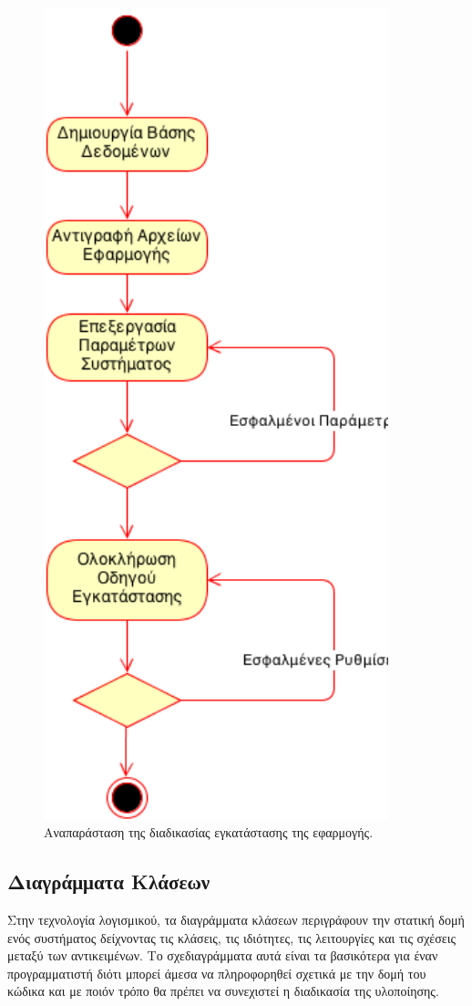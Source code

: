 \begin{figure}[H]
\centering
\includegraphics[width=100mm]{images/ad-install-application.png}
\caption{Αναπαράσταση της διαδικασίας εγκατάστασης της εφαρμογής.}
\label{ad-install-application}
\end{figure}

\subsection{Διαγράμματα Κλάσεων}
Στην τεχνολογία λογισμικού, τα διαγράμματα κλάσεων περιγράφουν την στατική δομή ενός συστήματος δείχνοντας τις κλάσεις, τις ιδιότητες, τις λειτουργίες και τις σχέσεις μεταξύ των αντικειμένων. Το σχεδιαγράμματα αυτά είναι τα βασικότερα για έναν προγραμματιστή διότι μπορεί άμεσα να πληροφορηθεί σχετικά με την δομή του κώδικα και με ποιόν τρόπο θα πρέπει να συνεχιστεί η διαδικασία της υλοποίησης.

